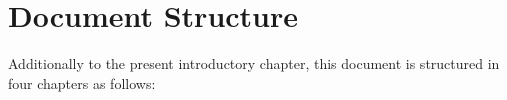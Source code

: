 



\section{Document Structure}

Additionally to the present introductory chapter, this document is structured in four chapters as follows:

